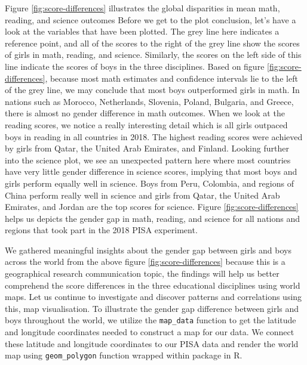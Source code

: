 Figure \ref{fig:score-differences} illustrates the global disparities in
mean math, reading, and science outcomes Before we get to the plot
conclusion, let's have a look at the variables that have been plotted.
The grey line here indicates a reference point, and all of the scores to
the right of the grey line show the scores of girls in math, reading,
and science. Similarly, the scores on the left side of this line
indicate the scores of boys in the three disciplines. Based on figure
\ref{fig:score-differences}, because most math estimates and confidence
intervals lie to the left of the grey line, we may conclude that most
boys outperformed girls in math. In nations such as Morocco,
Netherlands, Slovenia, Poland, Bulgaria, and Greece, there is almost no
gender difference in math outcomes. When we look at the reading scores,
we notice a really interesting detail which is all girls outpaced boys
in reading in all countries in 2018. The highest reading scores were
achieved by girls from Qatar, the United Arab Emirates, and Finland.
Looking further into the science plot, we see an unexpected pattern here
where most countries have very little gender difference in science
scores, implying that most boys and girls perform equally well in
science. Boys from Peru, Colombia, and regions of China perform really
well in science and girls from Qatar, the United Arab Emirates, and
Jordan are the top scores for science. Figure
\ref{fig:score-differences} helps us depicts the gender gap in math,
reading, and science for all nations and regions that took part in the
2018 PISA experiment.

We gathered meaningful insights about the gender gap between girls and
boys across the world from the above figure \ref{fig:score-differences}
because this is a geographical research communication topic, the
findings will help us better comprehend the score differences in the
three educational disciplines using world maps. Let us continue to
investigate and discover patterns and correlations using this, map
visualisation. To illustrate the gender gap difference between girls and
boys throughout the world, we utilize the \texttt{map\_data} function to
get the latitude and longitude coordinates needed to construct a map for
our data. We connect these latitude and longitude coordinates to our
PISA data and render the world map using \texttt{geom\_polygon} function
wrapped within  \citep{ggplot2} package in R.


